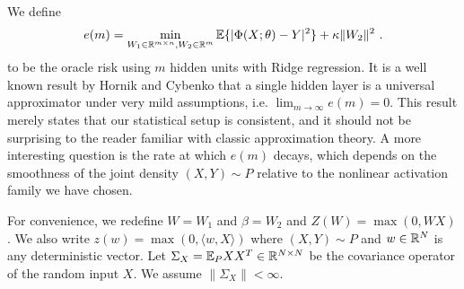 We define
\begin{equation}
\label{bla2}
e(m) = \min_{W_1 \in {\mathbb{R}}^{m \times n}, W_2 \in {\mathbb{R}}^m} {\mathbb{E}}\{ | \Phi(X; \theta) - Y|^2 \} + \kappa \| W_2 \|^2~.
\end{equation}
to be the oracle risk using $m$ hidden units with Ridge regression. 
It is a well known result by Hornik and Cybenko that a single hidden layer 
is a universal approximator under very mild assumptions, i.e. $\lim_{m \to \infty} e(m) = 0$.
This result merely states that our statistical setup is consistent, and it should not be 
surprising to the reader familiar with classic approximation theory.
 A more interesting question is the rate at which $e(m)$ decays, which depends 
on the smoothness of the joint density $(X, Y) \sim P$ relative to the nonlinear activation 
family we have chosen.

For convenience, we redefine $W = W_1$ and $\beta = W_2$ and
 $Z(W) = \max(0, W X)$. We also write $z(w) = \max(0, \langle w, X \rangle)$ where $(X, Y) \sim P$ and $w \in {\mathbb{R}}^N$ is any deterministic vector.
Let $\Sigma_X = {\mathbb{E}}_{P} XX^T \in {\mathbb{R}}^{N \times N}$ be the covariance operator of the random input $X$. We assume $\| \Sigma_X \| < \infty$. 

